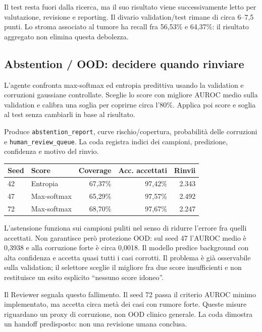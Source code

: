 \documentclass[11pt,a4paper]{article}
\newcommand{\artefatto}[1]{\nolinkurl{#1}}
\begin{document}
Il test resta fuori dalla ricerca, ma il suo risultato viene successivamente
letto per valutazione, revisione e reporting. Il divario validation/test
rimane di circa 6--7,5 punti. Lo stroma associato al tumore ha recall
fra 56,53\% e 64,37\%: il risultato aggregato non elimina questa debolezza.

\subsection{Abstention / OOD: decidere quando rinviare}
L'agente confronta max-softmax ed entropia predittiva usando la validation
e corruzioni gaussiane controllate. Sceglie lo score con migliore AUROC
medio sulla validation e calibra una soglia per coprirne circa l'80\%.
Applica poi score e soglia al test senza cambiarli in base al risultato.

Produce \artefatto{abstention_report}, curve rischio/copertura, probabilità
delle corruzioni e \artefatto{human_review_queue}. La coda registra indici
dei campioni, predizione, confidenza e motivo del rinvio.

\begin{center}\small
\begin{tabular}{@{}llrrr@{}}
\toprule
\textbf{Seed} & \textbf{Score} & \textbf{Coverage} & \textbf{Acc. accettati} & \textbf{Rinvii}\\
\midrule
42 & Entropia & 67,37\% & 97,42\% & 2.343\\
47 & Max-softmax & 65,29\% & 97,57\% & 2.492\\
72 & Max-softmax & 68,70\% & 97,67\% & 2.247\\
\bottomrule
\end{tabular}
\end{center}

L'astensione funziona sui campioni puliti nel senso di ridurre l'errore
fra quelli accettati. Non garantisce però protezione OOD: sul seed 47
l'AUROC medio è 0,3938 e alla corruzione forte è circa 0,0018. Il modello
predice background con alta confidenza e accetta quasi tutti i casi corrotti.
Il problema è già osservabile sulla validation; il selettore sceglie
il migliore fra due score insufficienti e non restituisce un esito
esplicito ``nessuno score idoneo''.

Il Reviewer segnala questo fallimento. Il seed 72 passa il criterio AUROC
minimo implementato, ma accetta circa metà dei casi con rumore forte.
Queste misure riguardano un proxy di corruzione, non OOD clinico generale.
La coda dimostra un handoff predisposto: non una revisione umana conclusa.
\end{document}
